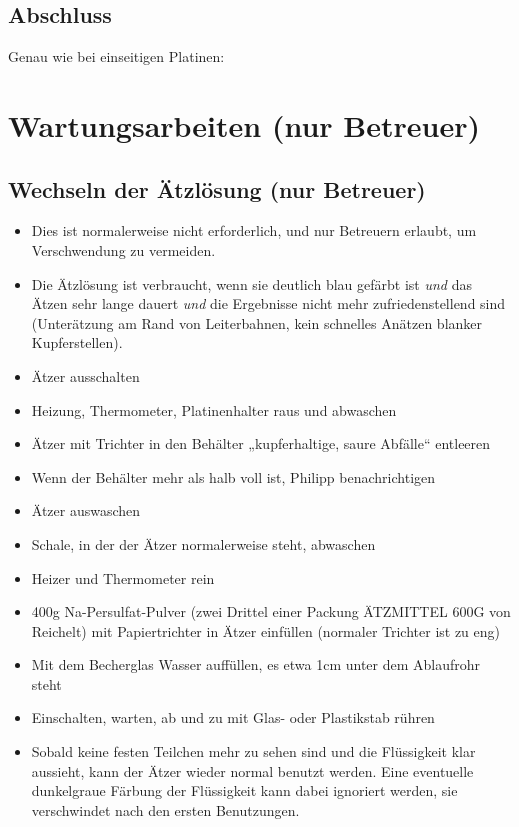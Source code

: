 \documentclass{\basedir/fablab-document}
\begin{document}
\subsection{Abschluss}
Genau wie bei einseitigen Platinen:

\abschluss

\section{Wartungsarbeiten (nur Betreuer)}

\subsection{Wechseln der Ätzlösung (nur Betreuer)}
\begin{itemize}
\item Dies ist normalerweise nicht erforderlich, und nur Betreuern erlaubt, um Verschwendung zu vermeiden.
\item Die Ätzlösung ist verbraucht, wenn sie deutlich blau gefärbt ist \emph{und} das Ätzen sehr lange dauert \emph{und} die Ergebnisse nicht mehr zufriedenstellend sind (Unterätzung am Rand von Leiterbahnen, kein schnelles Anätzen blanker Kupferstellen).
\item Ätzer ausschalten
\end{itemize}
\begin{itemize}
\item Heizung, Thermometer, Platinenhalter raus und abwaschen
\item Ätzer mit Trichter in den Behälter „kupferhaltige, saure Abfälle“ entleeren
\item Wenn der Behälter mehr als halb voll ist, Philipp benachrichtigen
\item Ätzer auswaschen
\item Schale, in der der Ätzer normalerweise steht, abwaschen
\item Heizer und Thermometer rein
\item 400g Na-Persulfat-Pulver (zwei Drittel einer Packung ÄTZMITTEL 600G von Reichelt) mit Papiertrichter in Ätzer einfüllen (normaler Trichter ist zu eng)
\item Mit dem Becherglas Wasser auffüllen, es etwa 1cm unter dem Ablaufrohr steht
\item Einschalten, warten, ab und zu mit Glas- oder Plastikstab rühren
\item Sobald keine festen Teilchen mehr zu sehen sind und die Flüssigkeit klar aussieht, kann der Ätzer wieder normal benutzt werden. Eine eventuelle dunkelgraue Färbung der Flüssigkeit kann dabei ignoriert werden, sie verschwindet nach den ersten Benutzungen.
\end{itemize}

\newpage
{}
\end{document}
